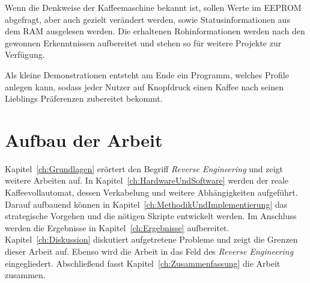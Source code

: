 Wenn die Denkweise der Kaffeemaschine bekannt ist, sollen Werte im \ac{EEPROM} abgefragt, aber auch gezielt verändert werden, sowie Statusinformationen aus dem \ac{RAM} ausgelesen werden.
Die erhaltenen Rohinformationen werden nach den gewonnen Erkenntnissen aufbereitet und stehen so für weitere Projekte zur Verfügung.

Als kleine Demonstrationen entsteht am Ende ein Programm, welches Profile anlegen kann, sodass jeder Nutzer auf Knopfdruck einen Kaffee nach seinen Lieblings Präferenzen zubereitet bekommt.

\section{Aufbau der Arbeit}
Kapitel~\ref{ch:Grundlagen} erörtert den Begriff \textit{Reverse Engineering} und zeigt weitere Arbeiten auf.
In Kapitel~\ref{ch:HardwareUndSoftware} werden der reale Kaffeevollautomat, dessen Verkabelung und weitere Abhängigkeiten aufgeführt.
Darauf aufbauend können in Kapitel~\ref{ch:MethodikUndImplementierung} das strategische Vorgehen und die nötigen Skripte entwickelt werden.
Im Anschluss werden die Ergebnisse in Kapitel~\ref{ch:Ergebnisse} aufbereitet.
Kapitel~\ref{ch:Diskussion} diskutiert aufgetretene Probleme und zeigt die Grenzen dieser Arbeit auf.
Ebenso wird die Arbeit in das Feld des \textit{Reverse Engineering} eingegliedert.
Abschließend fasst Kapitel~\ref{ch:Zusammenfassung} die Arbeit zusammen.
